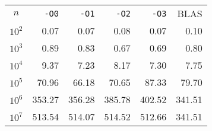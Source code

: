 \begin{center}
  \bgroup{}
  \begin{tabular}{c|rrrr|r}
    \hline
    $n$ & \texttt{-O0} & \texttt{-O1} & \texttt{-O2} & \texttt{-O3} & BLAS\\
    \hhline{======}
    $10^2$ & 0.07 & 0.07 & 0.08 & 0.07 & 0.10 \\
    $10^3$ & 0.89 & 0.83 & 0.67 & 0.69 & 0.80 \\
    $10^4$ & 9.37 & 7.23 & 8.17 & 7.30 & 7.75 \\
    $10^5$ & 70.96 & 66.18 & 70.65 & 87.33 & 79.70 \\
    $10^6$ & 353.27 & 356.28 & 385.78 & 402.52 & 341.51 \\
    $10^7$ & 513.54 & 514.07 & 514.52 & 512.66 & 341.51 \\
    \hline
  \end{tabular}
  \egroup
\end{center}
